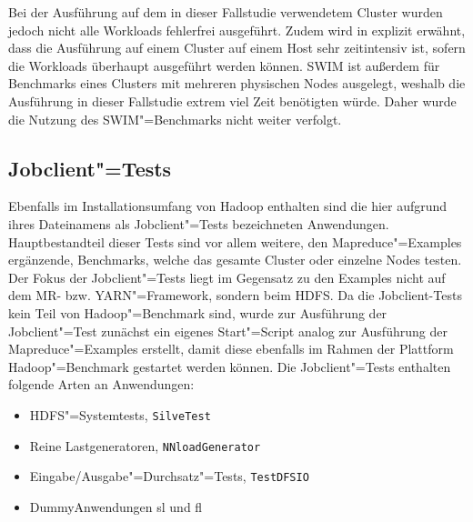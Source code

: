 Bei der Ausführung auf dem in dieser Fallstudie verwendetem Cluster wurden jedoch nicht alle Workloads fehlerfrei ausgeführt.
Zudem wird in \cite{InriaTutorial} explizit erwähnt, dass die Ausführung auf einem Cluster auf einem Host sehr zeitintensiv ist, sofern die Workloads überhaupt ausgeführt werden können.
\gls{SWIM} ist außerdem für Benchmarks eines Clusters mit mehreren physischen Nodes ausgelegt, weshalb die Ausführung in dieser Fallstudie extrem viel Zeit benötigten würde.
Daher wurde die Nutzung des \gls{SWIM}"=Benchmarks nicht weiter verfolgt.

\subsection{Jobclient"=Tests}
\label{subsec:jobclient}

Ebenfalls im Installationsumfang von Hadoop enthalten sind die hier aufgrund ihres Dateinamens als Jobclient"=Tests bezeichneten Anwendungen.
Hauptbestandteil dieser Tests sind vor allem weitere, den Mapreduce"=Examples ergänzende, Benchmarks, welche das gesamte Cluster oder einzelne Nodes testen.
Der Fokus der Jobclient"=Tests liegt im Gegensatz zu den Examples nicht auf dem \gls{MR}- bzw. YARN"=Framework, sondern beim HDFS.
Da die Jobclient-Tests kein Teil von Hadoop"=Benchmark sind, wurde zur Ausführung der Jobclient"=Test zunächst ein eigenes Start"=Script analog zur Ausführung der Mapreduce"=Examples erstellt, damit diese ebenfalls im Rahmen der Plattform Hadoop"=Benchmark gestartet werden können.
Die Jobclient"=Tests enthalten \uA folgende Arten an Anwendungen:

\begin{itemize}
    \item HDFS"=Systemtests, \zB \texttt{SilveTest}
    \item Reine Lastgeneratoren, \zB \texttt{NNloadGenerator}
    \item Eingabe/Ausgabe"=Durchsatz"=Tests, \zB \texttt{TestDFSIO}
    \item DummyAnwendungen \acrlong{sl} und \acrlong{fl}
\end{itemize}
